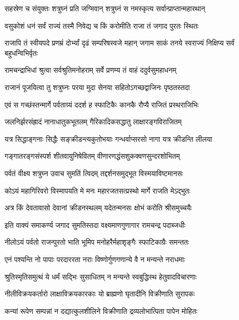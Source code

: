 \twolineshloka
{सहस्रेण च संयुक्तः शत्रुघ्नं प्रति जग्मिवान्}
{शत्रुघ्नं स नमस्कृत्य सर्वान्प्राप्तान्महारथान्}%

\twolineshloka
{वसुकोशं धनं सर्वं राज्यं तस्मै निवेद्य च}
{किं करोमीति राजा तं जगाद पुरतः स्थितः}%

\fourlineindentedshloka
{राजापि तं स्वीयपदे प्रणम्रं}
{दोर्भ्यां दृढं सम्परिषस्वजे महान्}
{जगाम साकं तनये स्वराज्यं}
{निक्षिप्य सर्वं बहुधन्विभिर्वृतः}%

\twolineshloka
{रामचन्द्राभिधां श्रुत्वा सर्वश्रुतिमनोहराम्}
{सर्वे प्रणम्य तं वाहं ददुर्वसुमहाधनम्}%

\twolineshloka
{राजानं पूजयित्वा तु शत्रुघ्नः परया मुदा}
{सेनया सहितोऽगच्छद्वाजिनः पृष्ठतस्तदा}%

\twolineshloka
{एवं स गच्छंस्तन्मार्गे पर्वताग्र्यं ददर्श ह}
{स्फाटिकैः कानकै रौप्यै राजितं प्रस्थराजिभिः}%

\twolineshloka
{जलनिर्झरसंह्रादं नानाधातुकभूतलम्}
{गैरिकादिकसद्धातु लाक्षारङ्गविराजितम्}%

\twolineshloka
{यत्र सिद्धाङ्गनाः सिद्धैः सङ्क्रीडन्त्यकुतोभयाः}
{गन्धर्वाप्सरसो नागा यत्र क्रीडन्ति लीलया}%

\twolineshloka
{गङ्गातरङ्गसंस्पर्श शीतवायुनिषेवितम्}
{वीणारणद्धंसशुकक्वणसुन्दरशोभितम्}%

\twolineshloka
{पर्वतं वीक्ष्य शत्रुघ्न उवाच सुमतिं त्विदम्}
{तद्दर्शनसमुद्भूत विस्मयाविष्टमानसः}%

\twolineshloka
{कोऽयं महागिरिवरो विस्मापयति मे मनः}
{महारजतसत्प्रस्थो मार्गे राजति मेऽद्भुतः}%

\twolineshloka
{अत्र किं देवतावासो देवानां क्रीडनस्थलम्}
{यदेतन्मनसः क्षोभं करोति श्रीसमुच्चयैः}%

\twolineshloka
{इति वाक्यं समाकर्ण्य जगाद सुमतिस्तदा}
{वक्ष्यमाणगुणागार रामचन्द्र पदाब्जधीः}%

\twolineshloka
{नीलोऽयं पर्वतो राजन्पुरतो भाति भूमिप}
{मनोहरैर्महाशृङ्गैः स्फाटिकाग्रैः समन्ततः}%

\twolineshloka
{एनं पश्यन्ति नो पापाः परदाररता नराः}
{विष्णोर्गुणगणान्ये वै न मन्यन्ते नराधमाः}%

\twolineshloka
{श्रुतिस्मृतिसमुत्थं ये धर्मं सद्भिः सुसाधितम्}
{न मन्यन्ते स्वबुद्धिस्थ हेतुवादविचारणाः}%

\twolineshloka
{नीलीविक्रयकर्तारो लाक्षाविक्रयकारकाः}
{यो ब्राह्मणो घृतादीनि विक्रीणाति सुरापकः}%

\twolineshloka
{कन्यां रूपेण सम्पन्नां न दद्यात्कुलशीलिने}
{विक्रीणाति द्रव्यलोभात्पिता पापेन मोहितः}%

